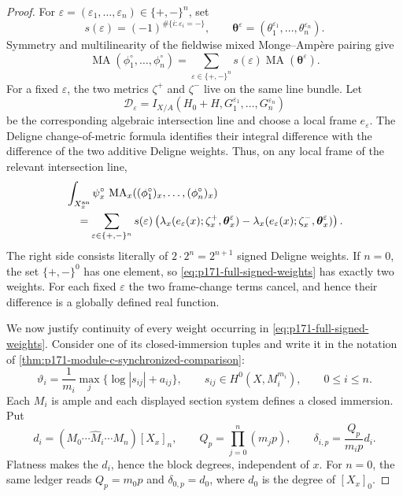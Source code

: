 \begin{proof}
For \(\varepsilon=(\varepsilon_1,\ldots,\varepsilon_n)\in
\{+,-\}^n\), set
\[
 s(\varepsilon)=(-1)^{\#\{i:\varepsilon_i=-\}},
 \qquad
 \boldsymbol\theta^\varepsilon
 =(\theta_1^{\varepsilon_1},\ldots,
   \theta_n^{\varepsilon_n}).
\]
Symmetry and multilinearity of the fieldwise mixed Monge--Amp\`ere
pairing give
\begin{equation}
 \operatorname{MA}(\phi_1^\circ,\ldots,\phi_n^\circ)
 =\sum_{\varepsilon\in\{+,-\}^n}s(\varepsilon)
   \operatorname{MA}(\boldsymbol\theta^\varepsilon).
 \label{eq:p171-full-ma-expansion}
\end{equation}
For a fixed \(\varepsilon\), the two metrics \(\zeta^+\) and
\(\zeta^-\) live on the same line bundle.  Let
\[
 \mathscr D_\varepsilon
 =I_{X/A}(H_0+H,G_1^{\varepsilon_1},\ldots,
   G_n^{\varepsilon_n})
\]
be the corresponding algebraic intersection line and choose a local frame
\(e_\varepsilon\).  The Deligne change-of-metric formula
\cite[Theorem~8.16, formula~(8.9)]{BE21} identifies their integral difference with
the difference of the two additive Deligne weights.  Thus, on any local
frame of the relevant intersection line,
\begin{align}
 &\int_{X_x^{\mathrm{an}}}\psi_x^\circ\,
     \operatorname{MA}_x
       ((\phi_1^\circ)_x,\ldots,(\phi_n^\circ)_x)\notag\\
 &\quad=
 \sum_{\varepsilon\in\{+,-\}^n}s(\varepsilon)
 \left(
 \lambda_x(e_\varepsilon(x);
           \zeta_x^+,\boldsymbol\theta_x^\varepsilon)
 -\lambda_x(e_\varepsilon(x);
           \zeta_x^-,\boldsymbol\theta_x^\varepsilon)
 \right).
 \label{eq:p171-full-signed-weights}
\end{align}
The right side consists literally of \(2\cdot2^n=2^{n+1}\) signed
Deligne weights.  If \(n=0\), the set \(\{+,-\}^0\) has one element,
so \eqref{eq:p171-full-signed-weights} has exactly two weights.  For each
fixed \(\varepsilon\) the two frame-change terms cancel, and hence their
difference is a globally defined real function.

We now justify continuity of every weight occurring in
\eqref{eq:p171-full-signed-weights}.  Consider one of its
closed-immersion tuples and write it in the notation of
\cref{thm:p171-module-c-synchronized-comparison}:
\[
 \vartheta_i=\frac1{m_i}\max_j
 \{\log|s_{ij}|+a_{ij}\},
 \qquad
 s_{ij}\in H^0(X,M_i^{m_i}),
 \qquad 0\leq i\leq n.
\]
Each \(M_i\) is ample and each displayed section system defines a closed
immersion.  Put
\begin{equation}
 d_i=(M_0\cdots\widehat M_i\cdots M_n)[X_x]_n,
 \qquad
 Q_p=\prod_{j=0}^n(m_jp),
 \qquad
 \delta_{i,p}=\frac{Q_p}{m_ip}d_i.
 \label{eq:p171-full-degree-ledger}
\end{equation}
Flatness makes the \(d_i\), hence the block degrees, independent of \(x\).
For \(n=0\), the same ledger reads
\(Q_p=m_0p\) and \(\delta_{0,p}=d_0\), where \(d_0\) is the degree of
\([X_x]_0\).


\end{proof}
